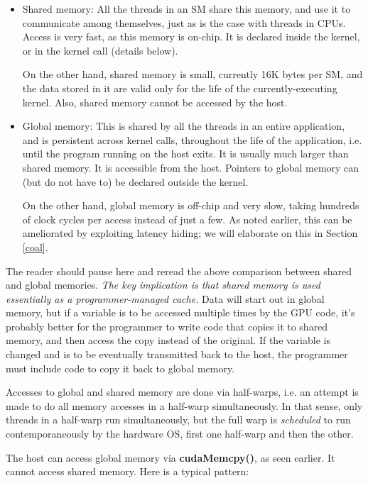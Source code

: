 \begin{itemize}

\item Shared memory:  All the threads in an SM share this memory, and
use it to communicate among themselves, just as is the case with threads
in CPUs.  Access is very fast, as this memory is on-chip.  It is
declared inside the kernel, or in the kernel call (details below).

On the other hand, shared memory is small, currently 16K bytes per SM,
and the data stored in it are valid only for the life of the
currently-executing kernel.  Also, shared memory cannot be accessed
by the host.

\item Global memory:  This is shared by all the threads in an entire
application, and is persistent across kernel calls, throughout the
life of the application, i.e. until the program running on the host
exits.  It is usually much larger than shared memory.  It is accessible
from the host.  Pointers to global memory can (but do not have to) be
declared outside the kernel. 

On the other hand, global memory is off-chip and very slow, taking
hundreds of clock cycles per access instead of just a few.  As noted
earlier, this can be ameliorated by exploiting latency hiding; we will
elaborate on this in Section \ref{coal}.

\end{itemize}

The reader should pause here and reread the above comparison between
shared and global memories.  {\it The key implication is that shared
memory is used essentially as a programmer-managed cache.} Data will
start out in global memory, but if a variable is to be accessed multiple
times by the GPU code, it's probably better for the programmer to
write code that copies it to shared memory, and then access the copy
instead of the original.  If the variable is changed and is to be
eventually transmitted back to the host, the programmer must include
code to copy it back to global memory.

Accesses to global and shared memory are done via half-warps, i.e. an
attempt is made to do all memory accesses in a half-warp simultaneously.
In that sense, only threads in a half-warp run simultaneously, but the
full warp is {\it scheduled} to run contemporaneously by the hardware
OS, first one half-warp and then the other.

The host can access global memory via {\bf cudaMemcpy()}, as seen
earlier.  It cannot access shared memory.  Here is a typical pattern:

